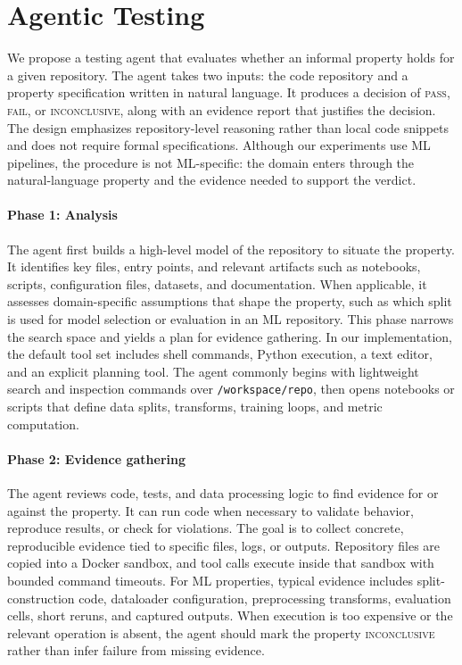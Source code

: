 \documentclass[11pt]{article}
\begin{document}
\section{Agentic Testing}

We propose a testing agent that evaluates whether an informal property holds for a given repository.
The agent takes two inputs: the code repository and a property specification written in natural language.
It produces a decision of \textsc{pass}, \textsc{fail}, or \textsc{inconclusive}, along with an evidence report that justifies the decision.
The design emphasizes repository-level reasoning rather than local code snippets and does not require formal specifications.
Although our experiments use ML pipelines, the procedure is not ML-specific: the domain enters through the natural-language property and the evidence needed to support the verdict.

\paragraph{Phase 1: Analysis}
The agent first builds a high-level model of the repository to situate the property.
It identifies key files, entry points, and relevant artifacts such as notebooks, scripts, configuration files, datasets, and documentation.
When applicable, it assesses domain-specific assumptions that shape the property, such as which split is used for model selection or evaluation in an ML repository.
This phase narrows the search space and yields a plan for evidence gathering.
In our implementation, the default tool set includes shell commands, Python execution, a text editor, and an explicit planning tool.
The agent commonly begins with lightweight search and inspection commands over \texttt{/workspace/repo}, then opens notebooks or scripts that define data splits, transforms, training loops, and metric computation.

\paragraph{Phase 2: Evidence gathering}
The agent reviews code, tests, and data processing logic to find evidence for or against the property.
It can run code when necessary to validate behavior, reproduce results, or check for violations.
The goal is to collect concrete, reproducible evidence tied to specific files, logs, or outputs.
Repository files are copied into a Docker sandbox, and tool calls execute inside that sandbox with bounded command timeouts.
For ML properties, typical evidence includes split-construction code, dataloader configuration, preprocessing transforms, evaluation cells, short reruns, and captured outputs.
When execution is too expensive or the relevant operation is absent, the agent should mark the property \textsc{inconclusive} rather than infer failure from missing evidence.
\end{document}
